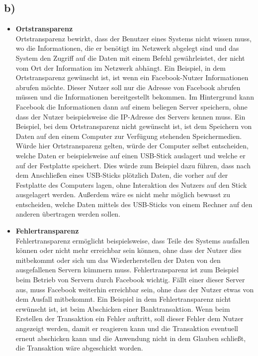 \documentclass[ngerman]{fbi-aufgabenblatt}
\begin{document}

\subsection*{b)}
\begin{itemize}
	\item \textbf{Ortstransparenz} \\
	Ortstransparenz bewirkt, dass der Benutzer eines Systems nicht wissen muss, wo die Informationen, die er benötigt im Netzwerk abgelegt sind und das System den Zugriff auf die Daten mit einem Befehl gewährleistet, der nicht vom Ort der Information im Netzwerk abhängt. Ein Beispiel, in dem Ortstransparenz gewünscht ist, ist wenn 
	ein Facebook-Nutzer Informationen abrufen möchte. Dieser Nutzer soll nur die Adresse von Facebook abrufen müssen und die Informationen bereitgestellt bekommen. Im Hintergrund kann Facebook die Informationen dann auf einem beliegen Server speichern, ohne dass der Nutzer beispielsweise die IP-Adresse des Servers kennen muss. Ein Beispiel, bei dem Ortstransparenz nicht gewünscht ist, ist dem Speichern von Daten auf den einem Computer zur Verfügung stehenden Speichermedien. Würde hier Ortstransparenz gelten, würde der Computer selbst entscheiden, welche Daten er beispielsweise auf einen USB-Stick auslagert und welche er auf der Festplatte speichert. Dies würde zum Beispiel dazu führen, dass nach dem Anschließen eines USB-Sticks plötzlich Daten, die vorher auf der Festplatte des Computers lagen, ohne Interaktion des Nutzers auf den Stick ausgelagert werden. Außerdem wäre es nicht mehr möglich bewusst zu entscheiden, welche Daten mittels des USB-Sticks von einem Rechner auf den anderen übertragen werden sollen.
	\item \textbf{Fehlertransparenz} \\
	Fehlertransparenz ermöglicht beispielsweise, dass Teile des Systems ausfallen können oder nicht mehr erreichbar sein können, ohne dass der Nutzer dies mitbekommt oder sich um das Wiederherstellen der Daten von den ausgefallenen Servern kümmern muss. Fehlertransparenz ist zum Beispiel beim Betrieb von Servern durch Facebook wichtig. Fällt einer dieser Server aus, muss Facebook weiterhin erreichbar sein, ohne dass der Nutzer etwas von dem Ausfall mitbekommt. Ein Beispiel in dem Fehlertransparenz nicht erwünscht ist, ist beim Abschicken einer Banktransaktion. Wenn beim Erstellen der Transaktion ein Fehler auftritt, soll dieser Fehler dem Nutzer angezeigt werden, damit er reagieren kann und die Transaktion eventuell erneut abschicken kann und die Anwendung nicht in dem Glauben schließt, die Transaktion wäre abgeschickt worden.
\end{itemize}
\end{document}
